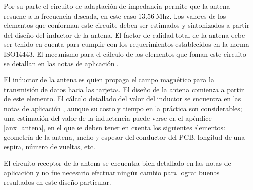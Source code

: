 \bigskip
{}

Por su parte el circuito de adaptación de impedancia permite que la antena resuene a la frecuencia deseada, en este caso 13,56 Mhz. Los valores de los elementos que conforman este circuito deben ser estimados y sintonizados a partir del diseño del inductor de la antena.
El factor de calidad total de la antena debe ser tenido en cuenta para cumplir con los requerimientos establecidos en la norma ISO14443. 
El mecanismo para el cálculo de los elementos que foman este circuito se detallan en las notas de aplicación \cite{MRICF}.

\bigskip
{}

El inductor de la antena es quien propaga el campo magnético para la transmisión de datos hacia las tarjetas. El diseño de la antena comienza a partir de este elemento.
El cálculo detallado del valor del inductor se encuentra en las notas de aplicación \cite{ACD}, aunque su costo y tiempo en la práctica son considerables; una estimación del valor de la inductancia puede verse en el apéndice \ref{anx_antena}, en el que se deben tener en cuenta los siguientes elementos: geometría de la antena, ancho y espesor del conductor del PCB, longitud de una espira, número de vueltas, etc.

\bigskip
{} 

El circuito receptor de la antena se encuentra bien detallado en las notas de aplicación \cite{MRICF} y no fue necesario efectuar ningún cambio para lograr buenos resultados en este diseño particular. 